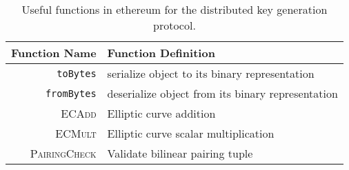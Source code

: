 \begin{table}[t]
\centering
\begin{tabular}{r|l}
\hline
Function Name & Function Definition \\
\hline
\texttt{toBytes} & serialize object to its binary representation \\
\texttt{fromBytes} & deserialize object from its binary representation \\
\textsc{ECAdd} & Elliptic curve addition \\
\textsc{ECMult} & Elliptic curve scalar multiplication \\
\textsc{PairingCheck} & Validate bilinear pairing tuple \\
\hline
\end{tabular}
\caption[Ethereum Functions]{Useful functions in \gls{ethereum} for
    the \gls{distributed key generation} protocol.}
\label{table:ethereum_functions}
\end{table}
